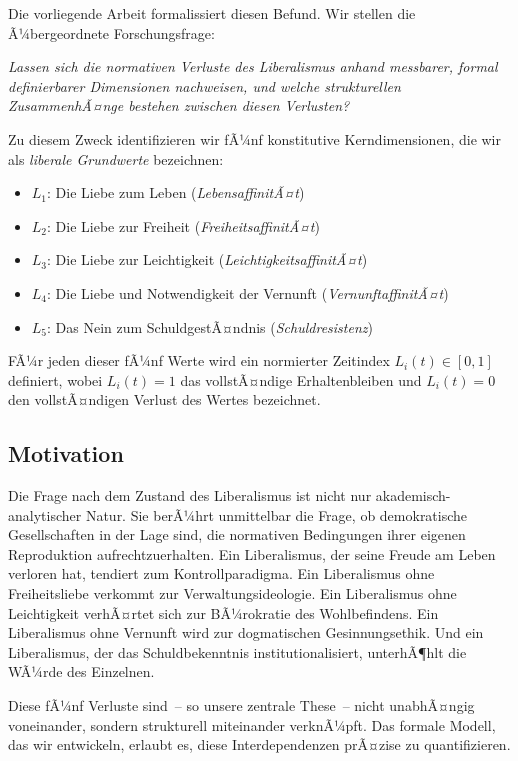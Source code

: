 ﻿\documentclass[a4paper,12pt]{article}
\theoremstyle{definition}
\begin{document}
Die vorliegende Arbeit formalissiert diesen Befund. Wir stellen die Ã¼bergeordnete Forschungsfrage:

\medskip
\textit{Lassen sich die normativen Verluste des Liberalismus anhand messbarer, formal definierbarer Dimensionen nachweisen, und welche strukturellen ZusammenhÃ¤nge bestehen zwischen diesen Verlusten?}
\medskip

Zu diesem Zweck identifizieren wir fÃ¼nf konstitutive Kerndimensionen, die wir als \emph{liberale Grundwerte} bezeichnen:

\begin{itemize}
	\item $L_1$: Die Liebe zum Leben (\emph{LebensaffinitÃ¤t})
	\item $L_2$: Die Liebe zur Freiheit (\emph{FreiheitsaffinitÃ¤t})
	\item $L_3$: Die Liebe zur Leichtigkeit (\emph{LeichtigkeitsaffinitÃ¤t})
	\item $L_4$: Die Liebe und Notwendigkeit der Vernunft (\emph{VernunftaffinitÃ¤t})
	\item $L_5$: Das Nein zum SchuldgestÃ¤ndnis (\emph{Schuldresistenz})
\end{itemize}

FÃ¼r jeden dieser fÃ¼nf Werte wird ein normierter Zeitindex $L_i(t) \in [0,1]$ definiert, wobei $L_i(t) = 1$ das vollstÃ¤ndige Erhaltenbleiben und $L_i(t) = 0$ den vollstÃ¤ndigen Verlust des Wertes bezeichnet.

\subsection{Motivation}

Die Frage nach dem Zustand des Liberalismus ist nicht nur akademisch-analytischer Natur. Sie berÃ¼hrt unmittelbar die Frage, ob demokratische Gesellschaften in der Lage sind, die normativen Bedingungen ihrer eigenen Reproduktion aufrechtzuerhalten. Ein Liberalismus, der seine Freude am Leben verloren hat, tendiert zum Kontrollparadigma. Ein Liberalismus ohne Freiheitsliebe verkommt zur Verwaltungsideologie. Ein Liberalismus ohne Leichtigkeit verhÃ¤rtet sich zur BÃ¼rokratie des Wohlbefindens. Ein Liberalismus ohne Vernunft wird zur dogmatischen Gesinnungsethik. Und ein Liberalismus, der das Schuldbekenntnis institutionalisiert, unterhÃ¶hlt die WÃ¼rde des Einzelnen.

Diese fÃ¼nf Verluste sind~-- so unsere zentrale These~-- nicht unabhÃ¤ngig voneinander, sondern strukturell miteinander verknÃ¼pft. Das formale Modell, das wir entwickeln, erlaubt es, diese Interdependenzen prÃ¤zise zu quantifizieren.
\end{document}
